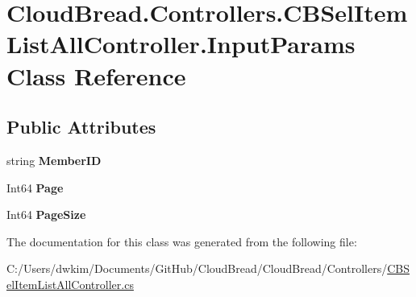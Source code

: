 \hypertarget{a00126}{}\section{Cloud\+Bread.\+Controllers.\+C\+B\+Sel\+Item\+List\+All\+Controller.\+Input\+Params Class Reference}
\label{a00126}
\subsection*{Public Attributes}
\begin{DoxyCompactItemize}
\item 
string {\bfseries Member\+ID}\hypertarget{a00126_a689a226c0080a19a73ffad84a4a247e3}{}\label{a00126_a689a226c0080a19a73ffad84a4a247e3}

\item 
Int64 {\bfseries Page}\hypertarget{a00126_a94caca6ea9144f92df69c8dafb467e8d}{}\label{a00126_a94caca6ea9144f92df69c8dafb467e8d}

\item 
Int64 {\bfseries Page\+Size}\hypertarget{a00126_a3dceea4c1312f04db711ec16013e8b43}{}\label{a00126_a3dceea4c1312f04db711ec16013e8b43}

\end{DoxyCompactItemize}


The documentation for this class was generated from the following file\+:\begin{DoxyCompactItemize}
\item 
C\+:/\+Users/dwkim/\+Documents/\+Git\+Hub/\+Cloud\+Bread/\+Cloud\+Bread/\+Controllers/\hyperlink{a00220}{C\+B\+Sel\+Item\+List\+All\+Controller.\+cs}\end{DoxyCompactItemize}
